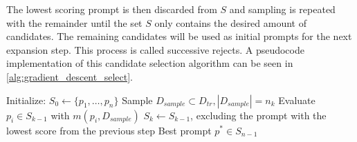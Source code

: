 The lowest scoring prompt is then discarded from $S$ and sampling is repeated with the remainder until the set $S$ only contains the desired amount of candidates.
The remaining candidates will be used as initial prompts for the next expansion step.
This process is called successive rejects.
A pseudocode implementation of this candidate selection algorithm can be seen in \autoref{alg:gradient_descent_select}.


\begin{algorithm}
\caption{}
\label{alg:gradient_descent_select}
\begin{algorithmic}[1]
    \State Initialize: $S_0 \gets \{p_1, \dots , p_n\}$
        \State Sample $D_{sample} \subset D_{tr}, |D_{sample}| = n_k$
        \State Evaluate $p_i \in S_{k-1}$ with $m(p_i, D_{sample})$
        \State $S_k \gets S_{k-1}$, excluding the prompt with the lowest score from the previous step
    \EndFor
    \State \Return Best prompt $p^* \in S_{n-1}$
\end{algorithmic}
\end{algorithm}